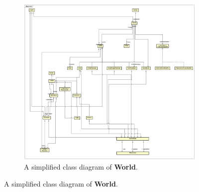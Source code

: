 \begin{figure}[h!]

\begin{subfigure}{\textwidth}
\centering
  \includegraphics[width=.9\linewidth]{Model_Class_Diagram}  
  \caption{A simplified class diagram of \textbf{World}.}
  \label{fig}
\end{subfigure}


\end{figure}

